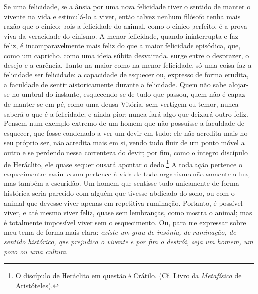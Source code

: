 Se uma felicidade, se a ânsia por uma nova felicidade tiver o sentido de
manter o vivente na vida e estimulá-lo a viver, então talvez nenhum
filósofo tenha mais razão que o cínico: pois a felicidade do animal,
como o cínico perfeito, é a prova viva da veracidade do cinismo. A menor
felicidade, quando ininterrupta e faz feliz, é incomparavelmente mais
feliz do que a maior felicidade episódica, que, como um capricho, como
uma ideia súbita desvairada, surge entre o desprazer, o desejo e a
carência. Tanto na maior como na menor felicidade, só uma coisa faz a
felicidade ser felicidade: a capacidade de esquecer ou, expresso de
forma erudita, a faculdade de sentir aistoricamente durante a
felicidade. Quem não sabe alojar-se no umbral do instante,
esquecendo-se de tudo que passou, quem não é capaz de manter-se em pé, 
como uma deusa Vitória, sem vertigem ou temor, nunca saberá o que
é a felicidade; e ainda pior: nunca fará algo que deixará outro feliz.
Pensem num exemplo extremo de um homem que não possuísse a faculdade de
esquecer, que fosse condenado a ver um devir em tudo: ele não acredita
mais no seu próprio ser, não acredita mais em si, vendo tudo fluir de um
ponto móvel a outro e se perdendo nessa correnteza do devir; por fim,
como o íntegro discípulo de Heráclito, ele quase sequer ousará apontar o
dedo.\footnote{O discípulo de Heráclito em questão é Crátilo. (Cf. Livro
   da \emph{Metafísica} de Aristóteles).} A toda ação pertence o
esquecimento: assim como pertence à vida de todo organismo não somente a
luz, mas também a escuridão. Um homem que sentisse tudo unicamente de
forma histórica seria parecido com alguém que tivesse abdicado do sono,
ou com o animal que devesse viver apenas em repetitiva ruminação.
Portanto, é possível viver, e até mesmo viver feliz, quase sem
lembranças, como mostra o animal; mas é totalmente impossível viver sem
o esquecimento. Ou, para me expressar sobre meu tema de forma mais
clara: \emph{existe um grau de insônia, de ruminação, de sentido
histórico, que prejudica o vivente e por fim o destrói, seja um homem,
um povo ou uma cultura}.

